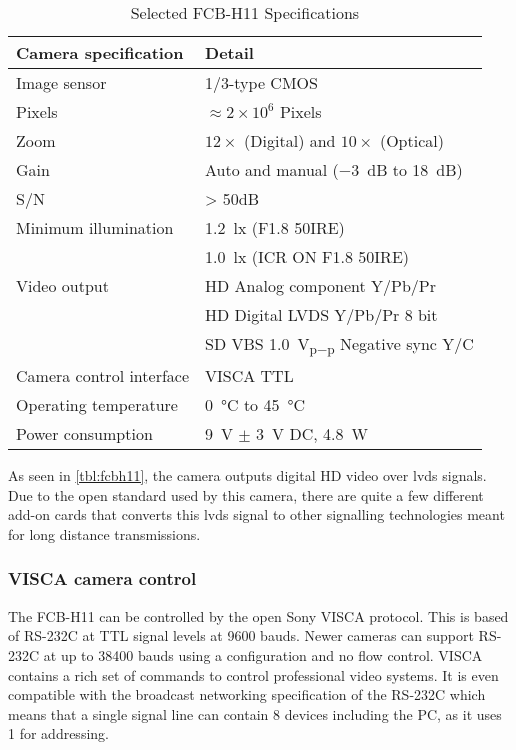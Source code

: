 \begin{table}[htbp]
	\centering
	\begin{tabular}{ll}

		\toprule
			Camera specification 	& Detail \\
		\midrule
			Image sensor 			& 1/3-type CMOS \\
			Pixels 					& $\approx 2 \times 10^{6}$ Pixels \\
			Zoom 					& $12\times$ (Digital) and $10\times$ (Optical) \\
			Gain 					& Auto and manual (\SI{-3}{\deci\bel} to \SI{18}{\deci\bel}) \\
			S/N						& > 50dB \\
			Minimum illumination 	& \SI{1.2}{\lux} (F1.8 50IRE) \\
									& \SI{1.0}{\lux} (ICR ON F1.8 50IRE) \\
			Video output			& HD Analog component Y/Pb/Pr \\
									& HD Digital LVDS Y/Pb/Pr 8 bit \\
									& SD VBS \SI{1.0}{\volt_{p-p}} Negative sync Y/C \\
			Camera control interface& VISCA TTL \\
			Operating temperature	& \SI{0}{\celsius} to \SI{45}{\celsius} \\
			Power consumption		& \SI{9}{\volt} $\pm$ \SI{3}{\volt} DC, \SI{4.8}{\watt} \\
		\bottomrule
	\end{tabular}
	\caption{Selected FCB-H11 Specifications}
	\label{tbl:fcbh11}
\end{table}


As seen in \vref{tbl:fcbh11}, the camera outputs digital HD video over \gls{lvds} signals.
Due to the open standard used by this camera, there are quite a few different add-on cards that 
converts this \gls{lvds} signal to other signalling technologies meant for long distance transmissions.

\subsubsection{VISCA camera control}\label{sec:visca}
The FCB-H11 can be controlled by the open Sony VISCA protocol. This is based of RS-232C at TTL signal levels
at 9600 bauds. Newer cameras can support RS-232C at up to 38400 bauds using a  configuration and no flow control. 
VISCA contains a rich set of commands to control professional video systems. It is even compatible with 
the broadcast networking specification of the RS-232C which means that a single signal line can contain 
8 devices including the PC, as it uses \SI{1}{\byte} for addressing.

